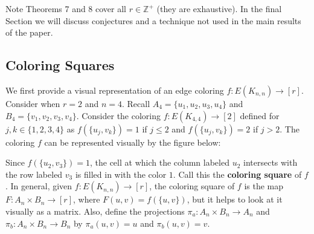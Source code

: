 \documentclass{article}
\begin{document}
\noindent
Note Theorems 7 and 8 cover all $r \in \mathbb{Z}^{+}$ (they are exhaustive). In the final Section we will discuss conjectures and a technique not used in the main results of the paper. 

\begin{center}
\section{Coloring Squares}
\end{center}

We first provide a visual representation of an edge coloring $f : E(K_{n,n}) \rightarrow [r]$. Consider when $r = 2$ and $n = 4$. Recall $A_4 = \{u_1,u_2,u_3,u_4\}$ and $B_4 = \{v_1,v_2,v_3,v_4\}$. Consider the coloring $f : E(K_{4,4}) \rightarrow [2]$ defined for $j,k \in \{1,2,3,4\}$ as $f(\{u_j,v_k\}) = 1$ if $j \leq 2$ and $f(\{u_j,v_k\}) = 2$ if $j > 2$. The coloring $f$ can be represented visually by the figure below: \\

\begin{center}
\end{center} 

\noindent
Since $f(\{u_2,v_3\}) = 1$, the cell at which the column labeled $u_2$ intersects with the row labeled $v_3$ is filled in with the color $1$. Call this the \textbf{coloring square} of $f$. In general, given $f : E(K_{n,n}) \rightarrow [r]$, the coloring square of $f$ is the map $F : A_n \times B_n \rightarrow [r]$, where $F(u,v) = f(\{u,v\})$, but it helps to look at it visually as a matrix. Also, define the projections $\pi_a : A_n \times B_n \rightarrow A_n$ and $\pi_b : A_n \times B_n \rightarrow B_n$ by $\pi_a(u,v) = u$ and $\pi_b(u,v) = v$. \\
\end{document}
